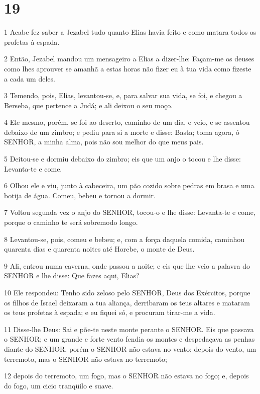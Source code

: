 \chapter{19}

\par 1 Acabe fez saber a Jezabel tudo quanto Elias havia feito e como matara todos os profetas à espada.
\par 2 Então, Jezabel mandou um mensageiro a Elias a dizer-lhe: Façam-me os deuses como lhes aprouver se amanhã a estas horas não fizer eu à tua vida como fizeste a cada um deles.
\par 3 Temendo, pois, Elias, levantou-se, e, para salvar sua vida, se foi, e chegou a Berseba, que pertence a Judá; e ali deixou o seu moço.
\par 4 Ele mesmo, porém, se foi ao deserto, caminho de um dia, e veio, e se assentou debaixo de um zimbro; e pediu para si a morte e disse: Basta; toma agora, ó SENHOR, a minha alma, pois não sou melhor do que meus pais.
\par 5 Deitou-se e dormiu debaixo do zimbro; eis que um anjo o tocou e lhe disse: Levanta-te e come.
\par 6 Olhou ele e viu, junto à cabeceira, um pão cozido sobre pedras em brasa e uma botija de água. Comeu, bebeu e tornou a dormir.
\par 7 Voltou segunda vez o anjo do SENHOR, tocou-o e lhe disse: Levanta-te e come, porque o caminho te será sobremodo longo.
\par 8 Levantou-se, pois, comeu e bebeu; e, com a força daquela comida, caminhou quarenta dias e quarenta noites até Horebe, o monte de Deus.
\par 9 Ali, entrou numa caverna, onde passou a noite; e eis que lhe veio a palavra do SENHOR e lhe disse: Que fazes aqui, Elias?
\par 10 Ele respondeu: Tenho sido zeloso pelo SENHOR, Deus dos Exércitos, porque os filhos de Israel deixaram a tua aliança, derribaram os teus altares e mataram os teus profetas à espada; e eu fiquei só, e procuram tirar-me a vida.
\par 11 Disse-lhe Deus: Sai e põe-te neste monte perante o SENHOR. Eis que passava o SENHOR; e um grande e forte vento fendia os montes e despedaçava as penhas diante do SENHOR, porém o SENHOR não estava no vento; depois do vento, um terremoto, mas o SENHOR não estava no terremoto;
\par 12 depois do terremoto, um fogo, mas o SENHOR não estava no fogo; e, depois do fogo, um cicio tranqüilo e suave.
